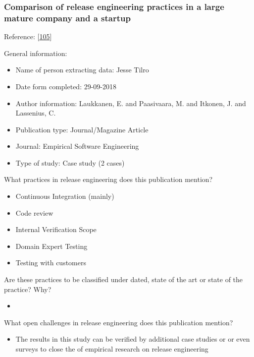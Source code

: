 \documentclass[]{book}
\providecommand{\tightlist}{%
  \setlength{\itemsep}{0pt}\setlength{\parskip}{0pt}}
\begin{document}
\subsubsection{Comparison of release engineering practices in a large
mature company and a
startup}\label{comparison-of-release-engineering-practices-in-a-large-mature-company-and-a-startup}

Reference: {[}\protect\hyperlink{ref-laukkanen2018a}{105}{]}

General information:

\begin{itemize}
\tightlist
\item
  Name of person extracting data: Jesse Tilro
\item
  Date form completed: 29-09-2018
\item
  Author information: Laukkanen, E. and Paasivaara, M. and Itkonen, J.
  and Lassenius, C.
\item
  Publication type: Journal/Magazine Article
\item
  Journal: Empirical Software Engineering
\item
  Type of study: Case study (2 cases)
\end{itemize}

What practices in release engineering does this publication mention?

\begin{itemize}
\tightlist
\item
  Continuous Integration (mainly)
\item
  Code review
\item
  Internal Verification Scope
\item
  Domain Expert Testing
\item
  Testing with customers
\end{itemize}

Are these practices to be classified under dated, state of the art or
state of the practice? Why?

\begin{itemize}
\item
\end{itemize}

What open challenges in release engineering does this publication
mention?

\begin{itemize}
\tightlist
\item
  The results in this study can be verified by additional case studies
  or or even surveys to close the of empirical research on release
  engineering
\end{itemize}
\end{document}
